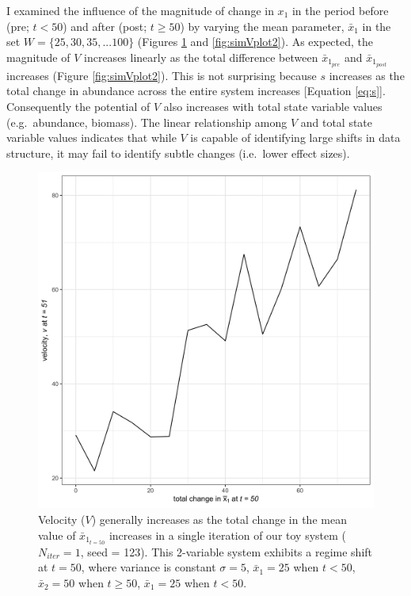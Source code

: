 \documentclass[print]{nuthesis}
\begin{document}
I examined the influence of the magnitude of change in \(x_1\) in the period before (pre; \(t <50\)) and after (post; \(t \geq 50\)) by varying the mean parameter, \(\bar{x}_1\) in the set \(W=\{25,30,35,...100 \}\) (Figures \ref{fig:simVplot1} and \ref{fig:simVplot2}). As expected, the magnitude of \(V\) increases linearly as the total difference between \(\bar{x}_{1_{pre}}\) and \(\bar{x}_{1_{post}}\) increases (Figure \ref{fig:simVplot2}). This is not surprising because \(s\) increases as the total change in abundance across the entire system increases {[}Equation \eqref{eq:s}{]}. Consequently the potential of \(V\) also increases with total state variable values (e.g.~abundance, biomass). The linear relationship among \(V\) and total state variable values indicates that while \(V\) is capable of identifying large shifts in data structure, it may fail to identify subtle changes (i.e.~lower effect sizes).
\begin{figure}
\includegraphics[width=0.85\linewidth]{./chapterFiles/velocity/figsCalledInDiss/simVplot1} \caption{Velocity ($V$) generally increases as the total change in the mean value of $\bar{x}_{1_{t=50}}$ increases in a single iteration of our toy system ($N_{iter}=1$, seed = 123). This 2-variable system exhibits a regime shift at $t=50$, where variance is constant $\sigma = 5$, $\bar{x}_1 = 25$ when $t<50$,  $\bar{x}_2=50$ when $t\geq50$, $\bar{x}_1 = 25$ when $t <50$.}\label{fig:simVplot1}
\end{figure}
\end{document}
